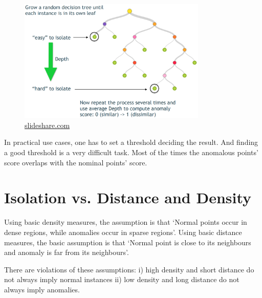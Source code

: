 \vspace{1em}
\begin{figure}[!ht]
    \centering
    \includegraphics[width=0.80\textwidth]{../fig/chapter2/iforest-visualization.png}
    {\href{https://www.slideshare.net/mlvlc/l14-anomaly-detection}{slideshare.com}}
    \label{fig:iforest-visualization}
\end{figure}

In practical use cases, one has to set a threshold deciding the result.
And finding a good threshold is a very difficult task.
Most of the times the anomalous points' score overlaps with the nominal points' score.

\section{Isolation vs. Distance and Density}
\label{sec:isolation-vs-distance-density}

Using basic density measures, the assumption is that ‘Normal points occur in dense regions, while anomalies occur in sparse regions’.
Using basic distance measures, the basic assumption is that ‘Normal point is close to its neighbours and anomaly is far from its neighbours’.

There are violations of these assumptions: i) high density and short distance do not always imply normal instances ii) low density and long distance do not always imply anomalies.

